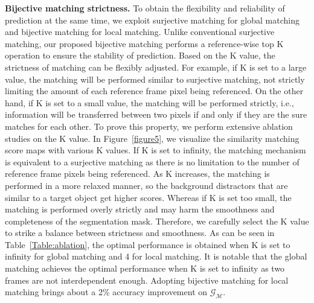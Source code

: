 \documentclass[10pt,twocolumn,letterpaper]{article}
\begin{document}
	\label{ablation}
	\noindent\textbf{Bijective matching strictness.} To obtain the flexibility and reliability of prediction at the same time, we exploit surjective matching for global matching and bijective matching for local matching. Unlike conventional surjective matching, our proposed bijective matching performs a reference-wise top K operation to ensure the stability of prediction. Based on the K value, the strictness of matching can be flexibly adjusted. For example, if K is set to a large value, the matching will be performed similar to surjective matching, not strictly limiting the amount of each reference frame pixel being referenced. On the other hand, if K is set to a small value, the matching will be performed strictly, i.e., information will be transferred between two pixels if and only if they are the sure matches for each other. To prove this property, we perform extensive ablation studies on the K value. In Figure~\ref{figure5}, we visualize the similarity matching score maps with various K values. If K is set to infinity, the matching mechanism is equivalent to a surjective matching as there is no limitation to the number of reference frame pixels being referenced. As K increases, the matching is performed in a more relaxed manner, so the background distractors that are similar to a target object get higher scores. Whereas if K is set too small, the matching is performed overly strictly and may harm the smoothness and completeness of the segmentation mask. Therefore, we carefully select the K value to strike a balance between strictness and smoothness. As can be seen in Table~\ref{Table:ablation}, the optimal performance is obtained when K is set to infinity for global matching and 4 for local matching. It is notable that the global matching achieves the optimal performance when K is set to infinity as two frames are not interdependent enough. Adopting bijective matching for local matching brings about a 2\% accuracy improvement on $\mathcal{G_M}$.
	
\end{document}
